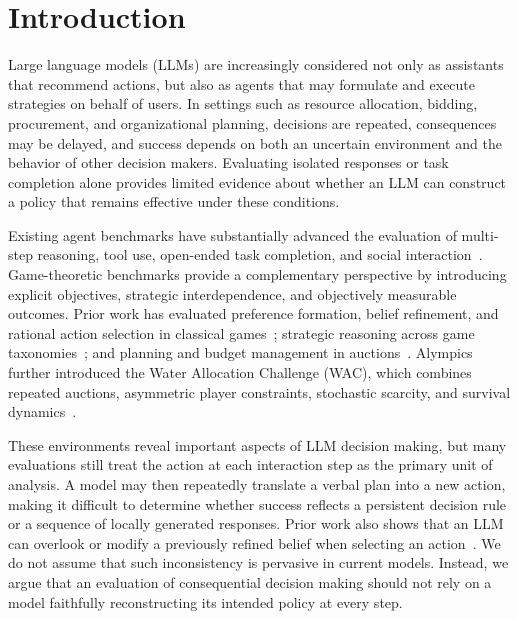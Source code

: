 \documentclass[letterpaper]{article} %
\begin{document}
\section{Introduction}

Large language models (LLMs) are increasingly considered not only as
assistants that recommend actions, but also as agents that may formulate and
execute strategies on behalf of users. In settings such as resource
allocation, bidding, procurement, and organizational planning, decisions are
repeated, consequences may be delayed, and success depends on both an
uncertain environment and the behavior of other decision makers. Evaluating
isolated responses or task completion alone provides limited evidence about
whether an LLM can construct a policy that remains effective under these
conditions.

Existing agent benchmarks have substantially advanced the evaluation of
multi-step reasoning, tool use, open-ended task completion, and social
interaction~\cite{liu2023agentbench,mialon2023gaia,zhou2024sotopia,zhu2025multiagentbench}.
Game-theoretic benchmarks provide a complementary perspective by introducing
explicit objectives, strategic interdependence, and objectively measurable
outcomes. Prior work has evaluated preference formation, belief refinement,
and rational action selection in classical games~\cite{fan2024rational};
strategic reasoning across game taxonomies~\cite{duan2024gtbench,huang2025gamabench};
and planning and budget management in auctions~\cite{chen2023aucarena}.
Alympics further introduced the Water Allocation Challenge (WAC), which
combines repeated auctions, asymmetric player constraints, stochastic
scarcity, and survival dynamics~\cite{mao2025alympics}.

These environments reveal important aspects of LLM decision making, but many
evaluations still treat the action at each interaction step as the primary
unit of analysis. A model may then repeatedly translate a verbal plan into a
new action, making it difficult to determine whether success reflects a
persistent decision rule or a sequence of locally generated responses. Prior
work also shows that an LLM can overlook or modify a previously refined belief
when selecting an action~\cite{fan2024rational}. We do not assume that such
inconsistency is pervasive in current models. Instead, we argue that an
evaluation of consequential decision making should not rely on a model
faithfully reconstructing its intended policy at every step.
\end{document}
